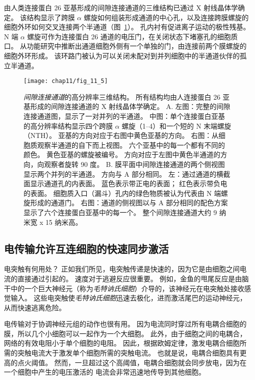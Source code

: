 由人类连接蛋白 26 亚基形成的间隙连接通道的三维结构已通过 X 射线晶体学确定。
该结构显示了跨膜 $\alpha$ 螺旋如何组装形成通道的中心孔，以及连接跨膜螺旋的细胞外环如何交叉连接两个半通道（图~\ref{fig:11_5}）。
孔内衬有促进离子运动的极性残基。
N 端 $\alpha$ 螺旋可作为连接蛋白 26 通道的电压门，在关闭状态下堵塞孔的细胞质口。
从功能研究中推断出通道细胞外侧有一个单独的门，由连接前两个膜螺旋的细胞外环形成。
该环路门被认为可以关闭未配对到并列细胞中的半通道伙伴的孤立半通道。


\begin{figure}[htbp]
	\centering
	\texttt{[image: chap11/fig\_11\_5]}
	\caption{\textit{间隙连接通道}的高分辨率三维结构。
		所有结构均由人连接蛋白 26 亚基形成的间隙连接通道的 X 射线晶体学确定。
		A. 左图：完整的间隙连接通道图，显示了一对并列的半通道。
		中图：单个连接蛋白亚基的高分辨率结构显示四个跨膜 $\alpha$ 螺旋（1–4）和一个短的 N 末端螺旋（NTH）。
		亚基的方向对应于右图中黄色亚基的方向。
		右图：从细胞质观察半通道的自下而上视图。
		六个亚基中的每一个都有不同的颜色。
		黄色亚基的螺旋被编号。
		方向对应于左图中黄色半通道的方向，向观察者旋转 90 度。
		B. 膜平面中间隙连接通道的两个侧视图显示两个并列的半通道。
		方向与 A 部分相同。
		左：通过通道的横截面显示通道孔的内表面。
		蓝色表示带正电的表面；
		红色表示带负电的表面。
		细胞质入口（漏斗）孔内的绿色物质被认为代表由 N 端螺旋形成的通道门。
		右图：通道的侧视图以与 A 部分相同的配色方案显示了六个连接蛋白亚基中的每一个。
		整个间隙连接通道大约 9 纳米宽 x 15 纳米高。}
	\label{fig:11_5}
\end{figure}


\subsection{电传输允许互连细胞的快速同步激活}

电突触有何用处？
正如我们所见，电突触传递是快速的，因为它是由细胞之间电流的直接通过引起的。
速度对于逃避反应很重要。
例如，金鱼的甩尾反应是由脑干中的一个巨大神经元（称为\textit{毛特讷氏细胞}）介导的，该神经元在电突触处接收感觉输入。
这些电突触使\textit{毛特讷氏细胞}迅速去极化，进而激活尾巴的运动神经元，从而快速逃离危险。


电传输对于协调神经元组的动作也很有用。
因为电流同时穿过所有电耦合细胞的膜，所以几个小细胞可以一起作为一个大细胞。
此外，由于细胞之间的电耦合，网络的有效电阻小于单个细胞的电阻。
因此，根据欧姆定律，激发电耦合细胞所需的突触电流大于激发单个细胞所需的突触电流。
也就是说，电耦合细胞具有更高的点火阈值。
然而，一旦超过这个高阈值，电耦合细胞就会同步放电，因为在一个细胞中产生的电压激活的  电流会非常迅速地传导到其他细胞。


